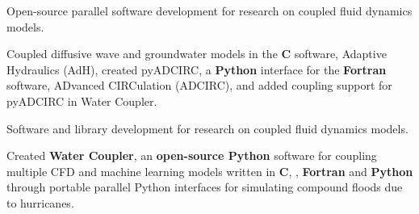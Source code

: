 \documentclass[letterpaper,10pt]{article}
\begin{document}

 
        \resumeItemListStart
            {Open-source parallel software development for research on coupled
            fluid dynamics models.}

            {Coupled diffusive wave and groundwater models in the \textbf{C}
            software, Adaptive Hydraulics (AdH), created pyADCIRC, a
            \textbf{Python} interface for the \textbf{Fortran} software,
            ADvanced CIRCulation (ADCIRC), and added coupling support for
            pyADCIRC in Water Coupler.}
        \resumeItemListEnd

 
        \resumeItemListStart
            {Software and library development for research on coupled
            fluid dynamics models.}

            {Created \textbf{Water Coupler}, an \textbf{open-source Python}
            software for coupling multiple CFD and machine learning models
            written in \textbf{C}, \textbf{\CC{}}, \textbf{Fortran} and
            \textbf{Python} through portable parallel Python interfaces for
            simulating compound floods due to hurricanes.}
       \resumeItemListEnd
\end{document}
